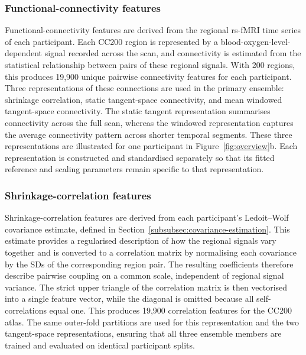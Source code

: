 \subsubsection{Functional-connectivity features}
\label{subsubsec:connectivity-features}

Functional-connectivity features are derived from the regional rs-fMRI time series of each
participant. Each CC200 region is represented by a blood-oxygen-level-dependent signal
recorded across the scan, and connectivity is estimated from the statistical relationship
between pairs of these regional signals. With 200 regions, this produces 19,900 unique
pairwise connectivity features for each participant. Three representations of these
connections are used in the primary ensemble: shrinkage correlation, static tangent-space
connectivity, and mean windowed tangent-space connectivity. The static tangent
representation summarises connectivity across the full scan, whereas the windowed
representation captures the average connectivity pattern across shorter temporal segments.
These three representations are illustrated for one participant in
Figure~\ref{fig:overview}b. Each representation is constructed and standardised separately
so that its fitted reference and scaling parameters remain specific to that representation.

\subsubsection{Shrinkage-correlation features}
\label{subsubsec:shrinkage-correlation}

Shrinkage-correlation features are derived from each participant's Ledoit--Wolf covariance
estimate, defined in Section~\ref{subsubsec:covariance-estimation}. This estimate provides a regularised
description of how the regional signals vary together and is converted to a correlation
matrix by normalising each covariance by the SDs of the corresponding
region pair. The resulting coefficients therefore describe pairwise coupling on a common
scale, independent of regional signal variance. The strict upper triangle of the
correlation matrix is then vectorised into a single feature vector, while the diagonal is
omitted because all self-correlations equal one. This produces 19,900 correlation features
for the CC200 atlas. The same outer-fold partitions are used for this representation and
the two tangent-space representations, ensuring that all three ensemble members are
trained and evaluated on identical participant splits.

